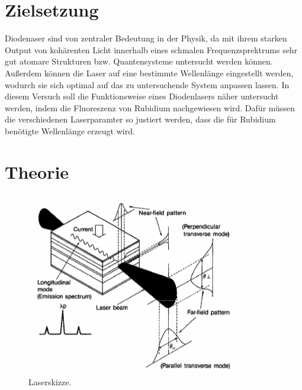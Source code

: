 \section{Zielsetzung}
\label{sec:Zielsetzung}
Diodenaser sind von zentraler Bedeutung in der Physik, da mit ihrem starken Output von kohärenten
Licht innerhalb eines schmalen Frequenzsprektrums sehr gut atomare Strukturen bzw. Quantensysteme
untersucht werden können. Außerdem können die Laser auf eine bestimmte Wellenlänge eingestellt werden, 
wodurch sie sich optimal auf das zu untersuchende System anpassen lassen.
In diesem Versuch soll die Funktionsweise eines Diodenlasers näher untersucht werden, indem die
Fluoreszenz von Rubidium nachgewiesen wird. Dafür müssen die verschiedenen Laserparamter so justiert werden,
dass die für Rubidium benötigte Wellenlänge erzeugt wird.

\section{Theorie}
\label{sec:Theorie}

\begin{figure}
    \centering
    \includegraphics{content/pics/laser.png}
    \caption{Laserskizze. \cite{V60}}
    \label{fig:laser}
\end{figure}
